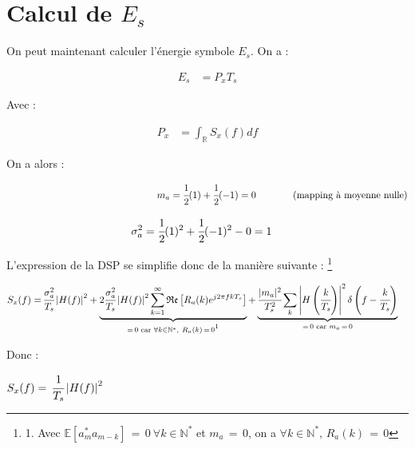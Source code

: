 \documentclass[11pt,a4paper]{report}
\newcommand\blfootnote[1]{%
  \begingroup
  \renewcommand\thefootnote{}\footnote{#1}%
  \addtocounter{footnote}{-1}%
  \endgroup
}
\begin{document}
\section{Calcul de $E_s$}

On peut maintenant calculer l'énergie symbole $E_s$. On a :

\begin{align*}
    E_s & = P_xT_s
\end{align*}

Avec :

\begin{align*}
    P_x & = \displaystyle\int_{\mathbb{R}} S_x(f) df
\end{align*}

On a alors :

\begin{align*}
    \hspace{5.5cm} m_a & = \cfrac{1}{2}(1) + \cfrac{1}{2}(-1) = 0 & \hspace{1cm} \text{(mapping à moyenne nulle)}
\end{align*}

\newpage

\begin{align*}
    \sigma_a^2 & = \cfrac{1}{2}(1)^2 + \cfrac{1}{2}(-1)^2 - 0 = 1
\end{align*}

L'expression de la DSP se simplifie donc de la manière suivante :
\blfootnote{1. Avec $\mathbb{E}\displaystyle\left[a_m^*a_{m-k} \right] \, = \, 0 ~ \forall k \in \mathbb{N^*}$ et $m_a \, = \, 0$, on a $\forall k \in \mathbb{N^*}, \, R_a(k) \, = \, 0$ }

\begin{align*}
S_{x}(f) = & \, \cfrac{\sigma_a^2}{T_s} \displaystyle\left\lvert H(f)\right\rvert ^2 + \underbrace{2 \cfrac{\sigma_a^2}{T_s} \displaystyle\left\lvert H(f)\right\rvert ^2 \sum_{k=1}^{\infty}\mathfrak{Re}\displaystyle\left[R_a(k)e^{j2\pi fkT_s}\right]}_{= \, 0 \text{ car } \forall k \in \mathbb{N^*}, ~ R_a(k) \, = \, 0 \footnotemark} + \underbrace{\cfrac{|m_a|^2}{T_s^2}\sum_k \displaystyle\left\vert H\displaystyle\left( \cfrac{k}{T_s}\right)\right\vert ^2\delta\displaystyle\left(f - \cfrac{k}{T_s}\right)}_{= \, 0 \text{ car } m_a \, = \, 0}
\end{align*}

Donc : 

\begin{center}
    $S_{x}(f) = \, \cfrac{1}{T_s} \displaystyle\left\lvert H(f)\right\rvert ^2$
\end{center}
\end{document}
